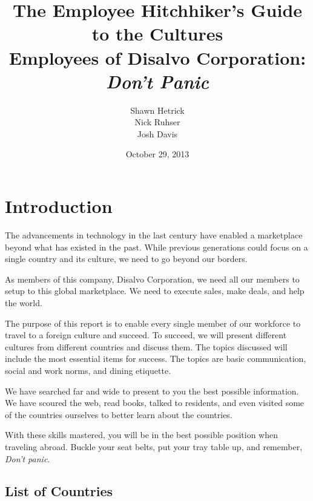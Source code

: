 \documentclass[11pt,a4paper,twoside]{report}
\title{
    \vspace{.1in}
    \textmd{\textbf{\Huge The Employee Hitchhiker's Guide to the Cultures}}\\
    \vspace{2in}
    \Large{Employees of Disalvo Corporation: \textit{Don't Panic}}
    \vspace{2in}
}
\author{
    Shawn Hetrick
    \\
    Nick Ruhser
    \\
    Josh Davis
    \vspace{1in}
}
\date{October 29, 2013}
\begin{document}
\thispagestyle{empty}
\renewcommand\headrulewidth{0pt}
\renewcommand\footrulewidth{0pt}

\maketitle

\newpage

\renewcommand\headrulewidth{0.4pt}
\renewcommand\footrulewidth{0.4pt}

\setcounter{secnumdepth}{0}
\setcounter{tocdepth}{3}


{\Large \tableofcontents}

\pagebreak

\doublespacing
{}

\chapter{Introduction}

The advancements in technology in the last century have enabled a marketplace
beyond what has existed in the past. While previous generations could focus on
a single country and its culture, we need to go beyond our borders.

As members of this company, Disalvo Corporation, we need all our members to
setup to this global marketplace. We need to execute sales, make deals, and
help the world.

The purpose of this report is to enable every single member of our workforce to
travel to a foreign culture and succeed. To succeed, we will present different
cultures from different countries and discuss them. The topics discussed will
include the most essential items for success. The topics are basic
communication, social and work norms, and dining etiquette.

We have searched far and wide to present to you the best possible information.
We have scoured the web, read books, talked to residents, and even visited some
of the countries ourselves to better learn about the countries.

With these skills mastered, you will be in the best possible position
when traveling abroad. Buckle your seat belts, put your tray table up,
and remember, \textit{Don't panic}.

\section{List of Countries}
\end{document}
